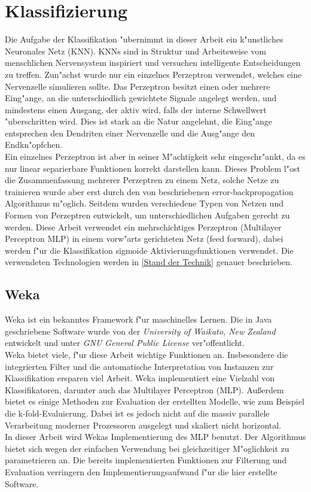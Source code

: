 \section{Klassifizierung}
\label{Klassifizierung}
Die Aufgabe der Klassifikation "ubernimmt in dieser Arbeit ein k"unstliches Neuronales Netz (KNN). KNNs sind in Struktur und Arbeitsweise vom menschlichen Nervensystem inspiriert \cite{kruse2011computational} und versuchen intelligente Entscheidungen zu treffen. Zun"achst wurde nur ein einzelnes Perzeptron verwendet, welches eine Nervenzelle simulieren sollte. Das Perzeptron besitzt einen oder mehrere Eing"ange, an die unterschiedlich gewichtete Signale angelegt werden, und mindestens einen Ausgang, der aktiv wird, falls der interne Schwellwert "uberschritten wird. Dies ist stark an die Natur angelehnt, die Eing"ange entsprechen den Dendriten einer Nervenzelle und die Ausg"ange den Endkn"opfchen\cite{kruse2011computational}. \\
Ein einzelnes Perzeptron ist aber in seiner M"achtigkeit sehr eingeschr"ankt, da es nur linear separierbare Funktionen korrekt darstellen kann. Dieses Problem l"ost die Zusammenfassung mehrerer Perzeptren zu einem Netz, solche Netze zu trainieren wurde aber erst durch den von \cite{werbos1974beyond} beschriebenen error-backpropagation Algorithmus m"oglich. Seitdem wurden verschiedene Typen von Netzen und Formen von Perzeptren entwickelt, um unterschiedlichen Aufgaben gerecht zu werden. Diese Arbeit verwendet ein mehrschichtiges Perzeptron (Multilayer Perceptron MLP) in einem vorw"arts gerichteten Netz (feed forward), dabei werden f"ur die Klassifikation sigmoide Aktivierungsfunktionen verwendet. Die verwendeten Technologien werden in \ref{Stand der Technik} genauer beschrieben.


\subsection{Weka}
\label{Weka}
Weka ist ein bekanntes Framework f"ur maschinelles Lernen. Die in Java geschriebene Software wurde von der \textit{University of Waikato, New Zealand} entwickelt und unter \textit{GNU General Public License} ver"offentlicht\cite{WekaHaupt}. \\
Weka bietet viele, f"ur diese Arbeit wichtige Funktionen an. Insbesondere die integrierten Filter und die automatische Interpretation von Instanzen zur Klassifikation ersparen viel Arbeit. Weka implementiert eine Vielzahl von Klassifikatoren, darunter auch das Multilayer Perceptron (MLP).
Au{\ss}erdem bietet es einige Methoden zur Evaluation der erstellten Modelle, wie zum Beispiel die k-fold-Evaluierung. Dabei ist es jedoch nicht auf die massiv parallele Verarbeitung moderner Prozessoren ausgelegt und skaliert nicht horizontal.\\
In dieser Arbeit wird Wekas Implementierung des MLP benutzt. Der Algorithmus bietet sich wegen der einfachen Verwendung bei gleichzeitiger M"oglichkeit zu parametrieren an. Die bereits implementierten  Funktionen zur Filterung und Evaluation verringern den Implementierungsaufwand f"ur die hier erstellte Software.

